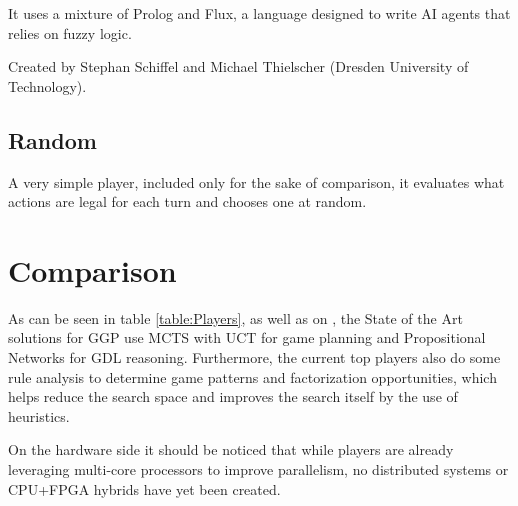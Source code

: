 It uses a mixture of Prolog and Flux, a language designed to write AI agents that relies on fuzzy logic.

Created by Stephan Schiffel and Michael Thielscher (Dresden University of Technology).

\subsection{Random}
A very simple player, included only for the sake of comparison, it evaluates what actions are legal for each turn and chooses one at random.




%
%

\section{Comparison}

As can be seen in table \ref{table:Players}, as well as on \cite{Swiechowski2015}, the State of the Art solutions for \gls{GGP} use \gls{MCTS} with \gls{UCT} for game planning and Propositional Networks for GDL reasoning. Furthermore, the current top players also do some rule analysis to determine game patterns and factorization opportunities, which helps reduce the search space and improves the search itself by the use of heuristics.

On the hardware side it should be noticed that while players are already leveraging multi-core processors to improve parallelism, no distributed systems or CPU+FPGA hybrids have yet been created.

